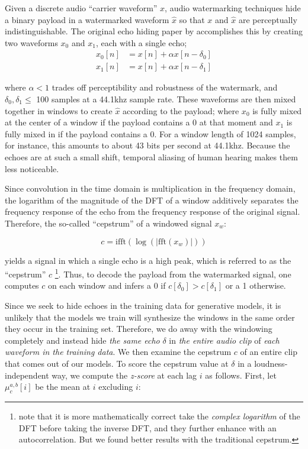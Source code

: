 \documentclass[letterpaper]{article} %
\begin{document}
Given a discrete audio ``carrier waveform'' $x$, audio watermarking techniques hide a binary payload in a watermarked waveform $\hat{x}$ so that $x$ and $\hat{x}$ are perceptually indistinguishable.  The original echo hiding paper by \cite{gruhl1996echo} accomplishes this by creating two waveforms $x_0$ and $x_1$, each with a single echo; 
\begin{equation}
    \label{eq:echohidesingle}
    \begin{aligned}
        x_0[n] &= x[n] + \alpha x[n - \delta_0] \\
        x_1[n] &= x[n] + \alpha x[n - \delta_1]
    \end{aligned}
\end{equation}

 where $\alpha < 1$ trades off perceptibility and robustness of the watermark, and $\delta_0, \delta_1 \leq $ 100 samples at a 44.1khz sample rate.  These waveforms are then mixed together in windows to create $\hat{x}$ according to the payload; where $x_0$ is fully mixed at the center of a window if the payload contains a 0 at that moment and $x_1$ is fully mixed in if the payload contains a 0.  For a window length of 1024 samples, for instance, this amounts to about 43 bits per second at 44.1khz.  Because the echoes are at such a small shift, temporal aliasing of human hearing makes them less noticeable.
 
 
Since convolution in the time domain is multiplication in the frequency domain, the logarithm of the magnitude of the DFT of a window additively separates the frequency response of the echo from the frequency response of the original signal.  Therefore, the so-called ``cepstrum'' of a windowed signal $x_w$:
 
\begin{equation}
    \label{eq:cepstrum}
    c = \text{ifft} ( \log ( | \text{fft} (x_w) | ) )
\end{equation}
 
yields a signal in which a single echo is a high peak, which is referred to as the ``cepstrum'' $c$ \footnote{\cite{gruhl1996echo} note that it is more mathematically correct take the {\em complex logarithm} of the DFT before taking the inverse DFT, and they further enhance with an autocorrelation.  But we found better results with the traditional cepstrum.}.  Thus, to decode the payload from the watermarked signal, one computes $c$ on each window and infers a 0 if $c[\delta_0] > c[\delta_1]$ or a 1 otherwise.

Since we seek to hide echoes in the training data for generative models, it is unlikely that the models we train will synthesize the windows in the same order they occur in the training set.  Therefore, we do away with the windowing completely and instead hide {\em the same echo} $\delta$ in {\em the entire audio clip} of {\em each waveform in the training data}.  We then examine the cepstrum $c$ of an entire clip that comes out of our models.  To score the cepstrum value at $\delta$ in a loudness-independent way, we compute the {\em z-score} at each lag $i$ as follows.  First, let $\mu_{c}^{a,b}[i]$ be the mean at $i$ excluding $i$:
\end{document}
